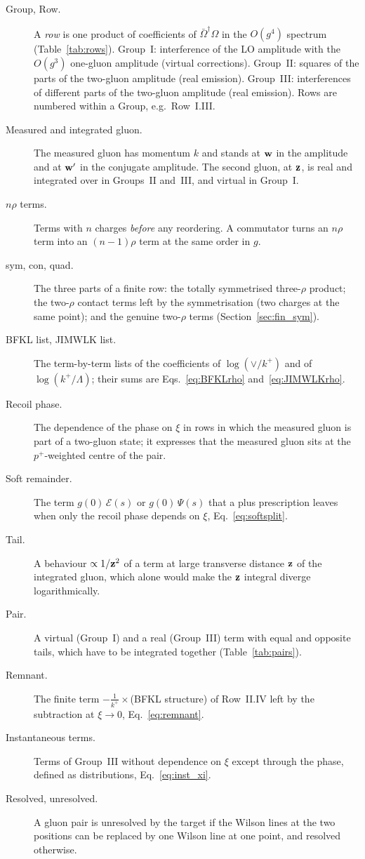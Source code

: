 \begin{description}
\item[Group, Row.] A \emph{row} is one product of coefficients of $\bar\Omega^\dagger\Omega$ in the $O(g^4)$ spectrum (Table~\ref{tab:rows}). Group~I: interference of the LO amplitude with the $O(g^3)$ one-gluon amplitude (virtual corrections). Group~II: squares of the parts of the two-gluon amplitude (real emission). Group~III: interferences of different parts of the two-gluon amplitude (real emission). Rows are numbered within a Group, e.g.\ Row~I.III.
\item[Measured and integrated gluon.] The measured gluon has momentum $k$ and stands at $\mathbf{w}$ in the amplitude and at $\mathbf{w}'$ in the conjugate amplitude. The second gluon, at $\mathbf{z}$, is real and integrated over in Groups~II and~III, and virtual in Group~I.
\item[$n\rho$ terms.] Terms with $n$ charges \emph{before} any reordering. A commutator turns an $n\rho$ term into an $(n-1)\rho$ term at the same order in $g$.
\item[sym, con, quad.] The three parts of a finite row: the totally symmetrised three-$\rho$ product; the two-$\rho$ contact terms left by the symmetrisation (two charges at the same point); and the genuine two-$\rho$ terms (Section~\ref{sec:fin_sym}).
\item[BFKL list, JIMWLK list.] The term-by-term lists of the coefficients of $\log(\vee/k^+)$ and of $\log(k^+/\Lambda)$; their sums are Eqs.~\eqref{eq:BFKLrho} and~\eqref{eq:JIMWLKrho}.
\item[Recoil phase.] The dependence of the phase on $\xi$ in rows in which the measured gluon is part of a two-gluon state; it expresses that the measured gluon sits at the $p^+$-weighted centre of the pair.
\item[Soft remainder.] The term $g(0)\,\mathcal E(s)$ or $g(0)\,\Psi(s)$ that a plus prescription leaves when only the recoil phase depends on $\xi$, Eq.~\eqref{eq:softsplit}.
\item[Tail.] A behaviour $\propto1/\mathbf{z}^2$ of a term at large transverse distance $\mathbf{z}$ of the integrated gluon, which alone would make the $\mathbf{z}$ integral diverge logarithmically.
\item[Pair.] A virtual (Group~I) and a real (Group~III) term with equal and opposite tails, which have to be integrated together (Table~\ref{tab:pairs}).
\item[Remnant.] The finite term $-\frac{1}{k^+}\times$(BFKL structure) of Row~II.IV left by the subtraction at $\xi\to0$, Eq.~\eqref{eq:remnant}.
\item[Instantaneous terms.] Terms of Group~III without dependence on $\xi$ except through the phase, defined as distributions, Eq.~\eqref{eq:inst_xi}.
\item[Resolved, unresolved.] A gluon pair is unresolved by the target if the Wilson lines at the two positions can be replaced by one Wilson line at one point, and resolved otherwise.
\end{description}

